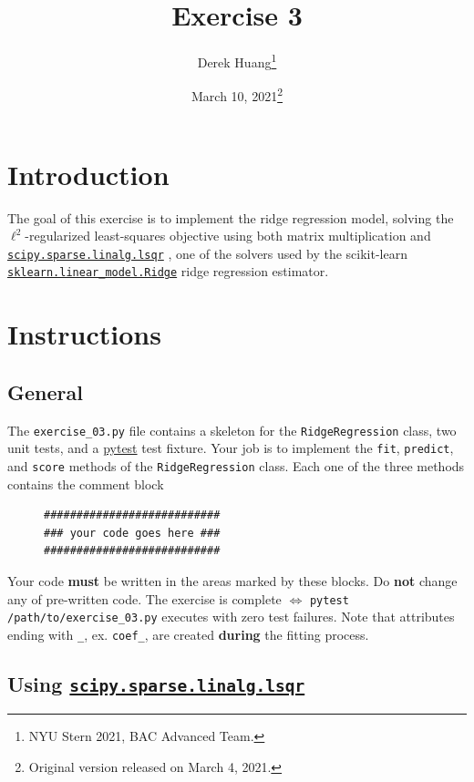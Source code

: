 \documentclass{article}
\title{Exercise 3}
\author{Derek Huang\thanks{NYU Stern 2021, BAC Advanced Team.}}
\date{March 10, 2021\thanks{Original version released on March 4, 2021.}}
\numberwithin{equation}{section}
\newcommand{\pytest}{%
    \href{https://docs.pytest.org/en/stable/}{pytest}%
}
\newcommand{\lsqr}{%
    \href{%
        https://docs.scipy.org/doc/scipy/reference/generated/%
        scipy.sparse.linalg.lsqr.html%
    }{\texttt{scipy.sparse.linalg.lsqr}}%
}
\newcommand{\skridge}{%
    \href{%
        https://scikit-learn.org/stable/modules/generated/%
        sklearn.linear_model.Ridge.html%
    }{\texttt{sklearn.linear\_model.Ridge}}%
}
\begin{document}
\maketitle
\thispagestyle{fancy}

\section{Introduction}

The goal of this exercise is to implement the ridge regression model,
solving the $ \ell^2 $-regularized least-squares objective using both
matrix multiplication and \lsqr, one of the solvers used by the scikit-learn
\skridge{} ridge regression estimator.

\section{Instructions}

\subsection{General}

The \texttt{exercise\_03.py} file contains a skeleton for the
\texttt{RidgeRegression} class, two unit tests, and a \pytest{} test fixture.
Your job is to implement the \texttt{fit}, \texttt{predict}, and
\texttt{score} methods of the \texttt{RidgeRegression} class. Each one of the
three methods contains the comment block

\begin{figure}[h!]
	\centering
	\begin{BVerbatim}
###########################
### your code goes here ###
###########################
	\end{BVerbatim}
	\vspace{-5 pt}
\end{figure}

Your code \textbf{must} be written in the areas marked by these blocks. Do
\textbf{not} change any of pre-written code. The exercise is complete
$ \Leftrightarrow $ \texttt{pytest /path/to/exercise\_03.py} executes with
zero test failures. Note that attributes ending with \texttt{\_}, ex.
\texttt{coef\_}, are created \textbf{during} the fitting process.

\subsection{Using \lsqr}
\end{document}
